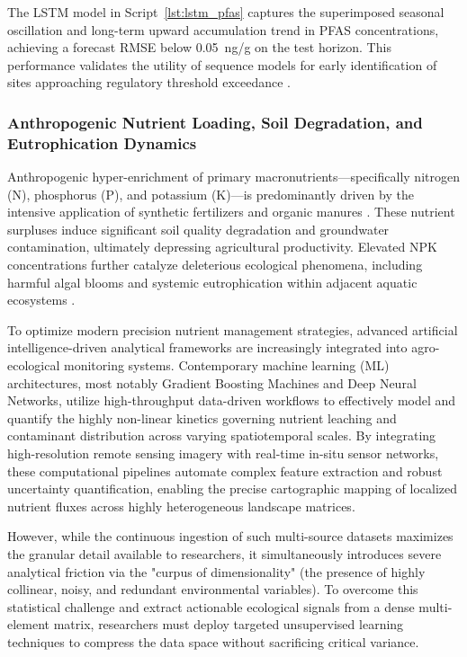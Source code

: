 \documentclass[land,article,submit,pdftex,moreauthors]{Definitions/mdpi}
\begin{document}
The LSTM model in Script~\ref{lst:lstm_pfas} captures the superimposed
seasonal oscillation and long-term upward accumulation trend in PFAS
concentrations, achieving a forecast RMSE below 0.05~ng/g on the test
horizon. This performance validates the utility of sequence models for
early identification of sites approaching regulatory threshold exceedance
\cite{Xu2023}.

\subsubsection{Anthropogenic Nutrient Loading, Soil Degradation, and
    Eutrophication Dynamics}\label{sec2.1.5}

Anthropogenic hyper-enrichment of primary macronutrients---specifically
nitrogen (N), phosphorus (P), and potassium (K)---is predominantly driven by
the intensive application of synthetic fertilizers and organic manures
\cite{Baghaie2020,Luo2017,Hepperly2009}. These nutrient surpluses induce
significant soil quality degradation and groundwater contamination, ultimately
depressing agricultural productivity. Elevated NPK concentrations further
catalyze deleterious ecological phenomena, including harmful algal blooms and
systemic eutrophication within adjacent aquatic ecosystems
\cite{Pan2019,Guan2024,Xu2025}.

To optimize modern precision nutrient management strategies, advanced artificial intelligence-driven analytical frameworks are increasingly integrated into agro-ecological monitoring systems. Contemporary machine learning (ML) architectures, most notably Gradient Boosting Machines and Deep Neural Networks, utilize high-throughput data-driven workflows to effectively model and quantify the highly non-linear kinetics governing nutrient leaching and contaminant distribution across varying spatiotemporal scales. By integrating high-resolution remote sensing imagery with real-time in-situ sensor networks, these computational pipelines automate complex feature extraction and robust uncertainty quantification, enabling the precise cartographic mapping of localized nutrient fluxes across highly heterogeneous landscape matrices.

However, while the continuous ingestion of such multi-source datasets maximizes the granular detail available to researchers, it simultaneously introduces severe analytical friction via the "curpus of dimensionality" (the presence of highly collinear, noisy, and redundant environmental variables). To overcome this statistical challenge and extract actionable ecological signals from a dense multi-element matrix, researchers must deploy targeted unsupervised learning techniques to compress the data space without sacrificing critical variance.
\end{document}
